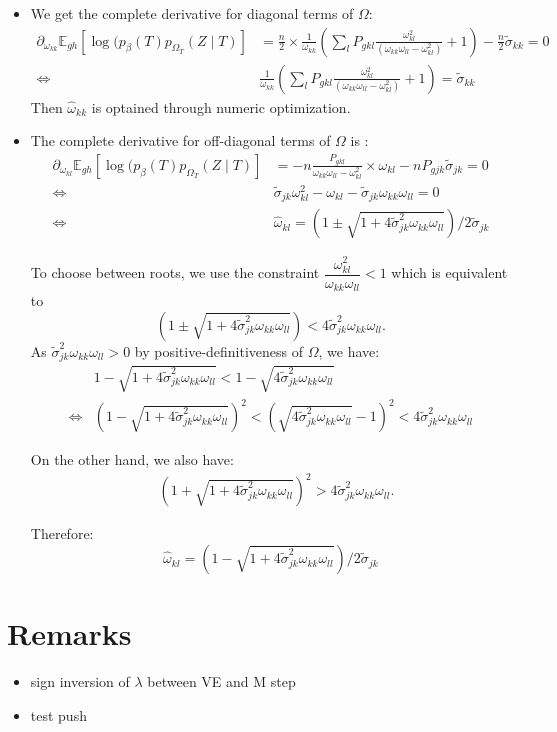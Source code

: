 \documentclass[11pt,a4paper]{article}
\newcommand{\Esp}{\mathds{E}}
\begin{document}
\begin{itemize}
\item We get the complete derivative for diagonal terms of $\Omega$:
\begin{align*}
 \partial_{\omega_{kk}}\Esp_{gh} [\log (p_\beta(T)p_{\Omega_T}(Z\mid T) ] &=\frac{n}{2} \times\frac{1}{\omega_{kk}} \left(\sum_l P_{gkl} \frac{\omega_{kl}^2}{(\omega_{kk}\omega_{ll}-\omega_{kl}^2)} + 1\right) -\frac{n}{2}\widetilde{\sigma}_{kk} =0\\
 \iff & \boxed{ \frac{1}{\omega_{kk}} \left(\sum_l P_{gkl} \frac{\omega_{kl}^2}{(\omega_{kk}\omega_{ll}-\omega_{kl}^2)} + 1\right) =\widetilde{\sigma}_{kk}}
\end{align*}
Then $\widehat{\omega}_{kk}$ is optained through numeric optimization.\\

\item The complete derivative for off-diagonal terms of $\Omega$ is :
\begin{align*}
 \partial_{\omega_{kl}}\Esp_{gh} [\log (p_\beta(T)p_{\Omega_T}(Z\mid T) ] &=-n \frac{P_{gkl} }{\omega_{kk}\omega_{ll}-\omega_{kl}^2}\times \omega_{kl} - n P_{gjk}  \widetilde{\sigma}_{jk} =0\\
 \iff & \widetilde{\sigma}_{jk} \omega_{kl}^2 - \omega_{kl} - \widetilde{\sigma}_{jk} \omega_{kk}\omega_{ll} = 0 \\
 \iff & \widehat{\omega}_{kl} = (1 \pm \sqrt{1+4\widetilde{\sigma}_{jk}^2 \omega_{kk}\omega_{ll}}) / 2\widetilde{\sigma}_{jk}
\end{align*}

To choose between roots, we use the constraint $\dfrac{\omega_{kl}^2}{\omega_{kk}\omega_{ll}} < 1$ which is equivalent to 
$$ (1 \pm \sqrt{1+4\widetilde{\sigma}_{jk}^2 \omega_{kk}\omega_{ll}}) < 4\widetilde{\sigma}_{jk}^2 \omega_{kk}\omega_{ll}.$$
As $\widetilde{\sigma}_{jk}^2 \omega_{kk}\omega_{ll} > 0$ by positive-definitiveness of $\Omega$, we have:
\begin{align*}
&1 - \sqrt{1+4\widetilde{\sigma}_{jk}^2 \omega_{kk}\omega_{ll}} < 1- \sqrt{4\widetilde{\sigma}_{jk}^2 \omega_{kk}\omega_{ll}}\\
\iff &(1 - \sqrt{1+4\widetilde{\sigma}_{jk}^2 \omega_{kk}\omega_{ll}})^2 < ( \sqrt{4\widetilde{\sigma}_{jk}^2 \omega_{kk}\omega_{ll}}-1)^2 < 4\widetilde{\sigma}_{jk}^2 \omega_{kk}\omega_{ll}
\end{align*}

On the other hand, we also have:
\begin{align*}
&(1 + \sqrt{1+4\widetilde{\sigma}_{jk}^2 \omega_{kk}\omega_{ll}})^2 >4\widetilde{\sigma}_{jk}^2 \omega_{kk}\omega_{ll}.
\end{align*}

Therefore: $$\boxed{ \widehat{\omega}_{kl} = (1 - \sqrt{1+4\widetilde{\sigma}_{jk}^2 \omega_{kk}\omega_{ll}}) / 2\widetilde{\sigma}_{jk}}$$

\end{itemize}


\section*{Remarks}
\begin{itemize}
\item sign inversion of $\lambda$ between VE and M step 
\item test push
\end{itemize}

\newpage

\end{document}
